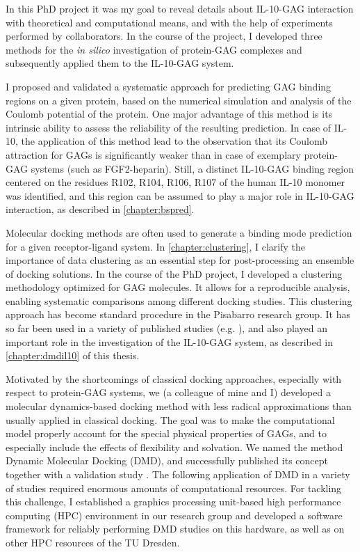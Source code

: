 In this PhD project it was my goal to reveal details about IL-10-GAG interaction
with theoretical and computational means, and with the help of experiments
performed by collaborators. In the course of the project, I developed three
methods for the \textit{in silico} investigation of protein-GAG complexes and
subsequently applied them to the IL-10-GAG system.

I proposed and validated a systematic approach for predicting GAG binding
regions on a given protein, based on the numerical simulation and analysis of
the Coulomb potential of the protein. One major advantage of this method is its
intrinsic ability to assess the reliability of the resulting prediction. In case
of IL-10, the application of this method lead to the observation that its
Coulomb attraction for GAGs is significantly weaker than in case of exemplary
protein-GAG systems (such as FGF2-heparin). Still, a distinct IL-10-GAG binding
region centered on the residues R102, R104, R106, R107 of the human IL-10
monomer was identified, and this region can be assumed to play a major role in
IL-10-GAG interaction, as described in \cref{chapter:bspred}.

Molecular docking methods are often used to generate a binding mode prediction
for a given receptor-ligand system. In \cref{chapter:clustering}, I clarify the
importance of data clustering as an essential step for post-processing an
ensemble of docking solutions. In the course of the PhD project, I developed a
clustering methodology optimized for GAG molecules. It allows for a reproducible
analysis, enabling systematic comparisons among different docking studies. This
clustering approach has become standard procedure in the Pisabarro research
group. It has so far been used in a variety of published studies (e.g.
\cite{franz_cathepsin_2013}), and also played an important role in the
investigation of the IL-10-GAG system, as described in \cref{chapter:dmdil10} of
this thesis.

Motivated by the shortcomings of classical docking approaches, especially with
respect to protein-GAG systems, we (a colleague of mine and I) developed a
molecular dynamics-based docking method with less radical approximations than
usually applied in classical docking. The goal was to make the computational
model properly account for the special physical properties of GAGs, and to
especially include the effects of flexibility and solvation. We named the method
Dynamic Molecular Docking (DMD), and successfully published its concept together
with a validation study \cite{dmd_samsonov_gehrcke_2014}. The following
application of DMD in a variety of studies required enormous amounts of
computational resources. For tackling this challenge, I established a graphics
processing unit-based high performance computing (HPC) environment in our
research group and developed a software framework for reliably performing DMD
studies on this hardware, as well as on other HPC resources of the TU Dresden.

